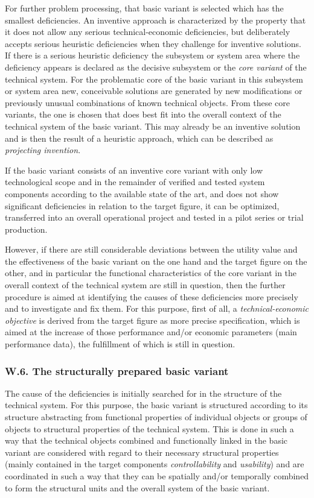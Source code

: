 \documentclass[11pt,a4paper]{article}
\begin{document}
For further problem processing, that basic variant is selected which has the
smallest deficiencies. An inventive approach is characterized by the property
that it does not allow any serious technical-economic deficiencies, but
deliberately accepts serious heuristic deficiencies when they challenge for
inventive solutions.  If there is a serious heuristic deficiency the subsystem
or system area where the deficiency appears is declared as the decisive
subsystem or the \emph{core variant} of the technical system. For the
problematic core of the basic variant in this subsystem or system area new,
conceivable solutions are generated by new modifications or previously unusual
combinations of known technical objects.  From these core variants, the one is
chosen that does best fit into the overall context of the technical system of
the basic variant. This may already be an inventive solution and is then the
result of a heuristic approach, which can be described as \emph{projecting
  invention}.

If the basic variant consists of an inventive core variant with only low
technological scope and in the remainder of verified and tested system
components according to the available state of the art, and does not show
significant deficiencies in relation to the target figure, it can be
optimized, transferred into an overall operational project and tested in a
pilot series or trial production.

However, if there are still considerable deviations between the utility value
and the effectiveness of the basic variant on the one hand and the target
figure on the other, and in particular the functional characteristics of the
core variant in the overall context of the technical system are still in
question, then the further procedure is aimed at identifying the causes of
these deficiencies more precisely and to investigate and fix them. For this
purpose, first of all, a \emph{technical-economic objective} is derived from
the target figure as more precise specification, which is aimed at the
increase of those performance and/or economic parameters (main performance
data), the fulfillment of which is still in question.

\subsubsection*{W.6. The structurally prepared basic variant}

The cause of the deficiencies is initially searched for in the structure of
the technical system. For this purpose, the basic variant is structured
according to its structure abstracting from functional properties of
individual objects or groups of objects to structural properties of the
technical system. This is done in such a way that the technical objects
combined and functionally linked in the basic variant are considered with
regard to their necessary structural properties (mainly contained in the
target components \emph{controllability} and \emph{usability}) and are
coordinated in such a way that they can be spatially and/or temporally
combined to form the structural units and the overall system of the basic
variant.
\end{document}
